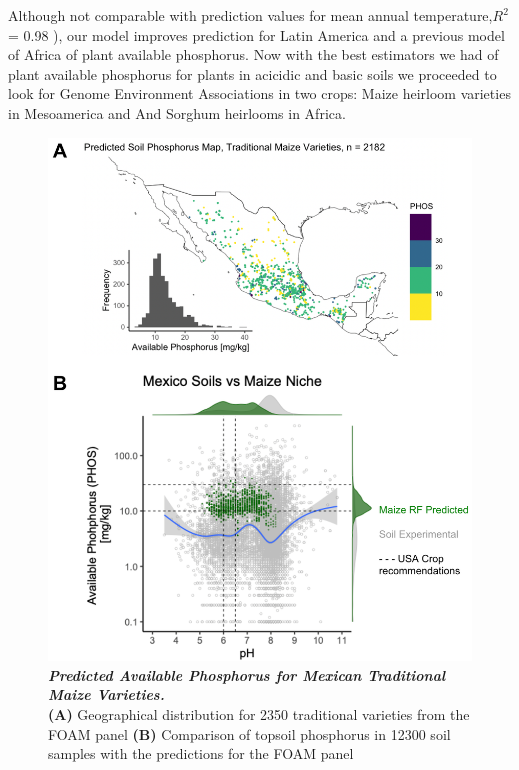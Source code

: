 Although not comparable with prediction values for mean annual temperature,$R^2$ = 0.98 \citep{fick2017}), our model improves prediction for Latin America \cite{mcdowell2023} and a previous model of Africa \citep{hengl2017a} of plant available phosphorus.
Now with the best estimators we had of plant available phosphorus for plants in acicidic and basic soils we proceeded to look for Genome Environment Associations in two crops: Maize heirloom varieties in Mesoamerica and And Sorghum heirlooms in Africa.

\begin{figure}[!ht]
\centering
\includegraphics[width=\linewidth]{Chapter-2/figs/predicted_PHOS.png}
\caption[Predicted Available Phosphorus for Mexican Traditional Maize Varieties]{\textit{\textbf{Predicted Available Phosphorus for Mexican Traditional Maize Varieties.}}
\\\hspace{\textwidth}
\textbf{(A)} Geographical distribution for 2350 traditional varieties from the FOAM panel \citep{romero_navarro2017-cn}
\textbf{(B)} Comparison of topsoil phosphorus in 12300 soil samples \citep{paz-pellat2018} with the predictions for the FOAM panel}
\label{fig::pointpred}
\end{figure}
\clearpage

